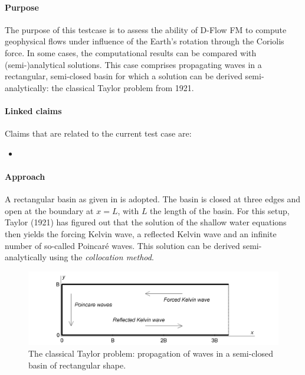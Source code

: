 

\paragraph*{Purpose}
The purpose of this testcase is to assess the ability of D-Flow FM to compute geophysical flows under influence of the Earth's rotation through the Coriolis force. In some cases, the computational results can be compared with (semi-)analytical solutions. This case comprises propagating waves in a rectangular, semi-closed basin for which a solution can be derived semi-analytically: the classical Taylor problem from 1921.

\paragraph*{Linked claims}
Claims that are related to the current test case are:
\begin{itemize}
\item {}
\end{itemize}

\paragraph*{Approach}
A rectangular basin as given in  is adopted. The basin is closed at three edges and open at the boundary at $x = L$, with $L$ the length of the basin. For this setup, Taylor (1921) has figured out that the solution of the shallow water equations then yields the forcing Kelvin wave, a reflected Kelvin wave and an infinite number of so-called Poincar\'e waves. This solution can be derived semi-analytically using the \emph{collocation method}.

\begin{figure}[h!]
\begin{center}
\includegraphics[width=1.0\columnwidth]{figures/basinplot.png}
\end{center}\caption{The classical Taylor problem: propagation of waves in a semi-closed basin of rectangular shape. \label{fig:wavesinbasinfricno}}
\end{figure}

